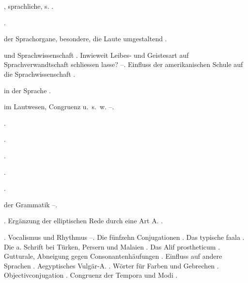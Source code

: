 \begin{register}


, sprachliche, s. .

 \pageref{sp.232}.

 der Sprachorgane, besondere, die Laute umgestaltend \pageref{sp.183}.

 und Sprachwissenschaft \pageref{sp.13}. Inwieweit Leibes- und Geistesart auf Sprachverwandtschaft schliessen lasse? \pageref{sp.147}–\pageref{sp.148}. Einfluss der amerikanischen Schule auf die Sprachwissenschaft \pageref{sp.159}.

 in der Sprache \pageref{sp.2}.


 im Lautwesen, Congruenz u.~s.~w. \pageref{sp.401}–\pageref{sp.403}.

.

 \pageref{sp.119}.



 \pageref{sp.201}.


 \pageref{sp.201}.

 \pageref{sp.21}.

 der Grammatik \pageref{sp.106}–\pageref{sp.107}.

 \pageref{sp.101}. Ergänzung der elliptischen Rede durch eine Art A. \pageref{sp.375}.

. Vocalismus und Rhythmus \pageref{sp.92}–\pageref{sp.93}. Die fünfzehn Conjugationen \pageref{sp.116}. Das typische fa{\ain}ala \pageref{sp.117}. Die a. Schrift bei Türken, Persern und Malaien \pageref{sp.129}. Das Alif prostheticum \pageref{sp.157}. Gutturale, Abneigung gegen Consonantenhäufungen \pageref{sp.197}.  Einfluss auf andere Sprachen \pageref{sp.271}. Aegyptisches Vulgär-A. \pageref{sp.276}.  Wörter für Farben und Gebrechen \pageref{sp.441}. Objectivconjugation \pageref{sp.460}. Congruenz der Tempora und Modi \pageref{sp.466}.


\end{register}
